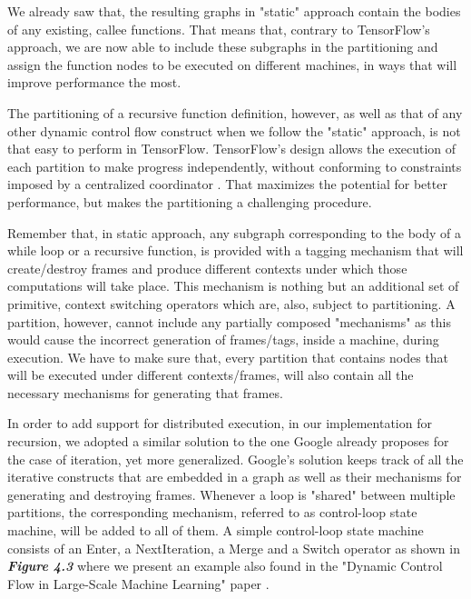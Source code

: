 \documentclass[ack,preface]{dithesis}
\begin{document}
We already saw that, the resulting graphs in "static" approach contain the bodies of any existing, callee functions. That means that, contrary to TensorFlow's approach, we are now able to include these subgraphs in the partitioning and assign the function nodes to be executed on different machines, in ways that will improve performance the most.

The partitioning of a recursive function definition, however, as well as that of any other dynamic control flow construct  when we follow the "static" approach, is not that easy to perform in TensorFlow.
TensorFlow's design allows the execution of each partition to make progress independently, without conforming to constraints imposed by a centralized coordinator \cite{Yu:2018}. That maximizes the potential for better performance, but makes the partitioning a challenging procedure.

Remember that, in static approach, any subgraph corresponding to the body of a while loop or a recursive function, is provided with a tagging mechanism that will create/destroy frames and produce different contexts under which those computations will take place. This mechanism is nothing but an additional set of primitive, context switching operators which are, also, subject to partitioning. A partition, however, cannot include any partially composed "mechanisms" as this would cause the incorrect generation of frames/tags, inside a machine, during execution. We have to make sure that, every partition that contains nodes that will be executed under different contexts/frames, will also contain all the necessary mechanisms for generating that frames.

In order to add support for distributed execution, in our implementation for recursion, we adopted a similar solution to the one Google already proposes for the case of iteration, yet more generalized. Google's solution keeps track of all the iterative constructs that are embedded in a graph as well as their mechanisms for generating and destroying frames. Whenever a loop is "shared" between multiple partitions, the corresponding mechanism, referred to as control-loop state machine,  will be added to all of them. A simple control-loop state machine consists of an Enter, a NextIteration, a Merge and a Switch operator as shown in  \textit{\textbf{Figure 4.3}} where we present an example also found in the "Dynamic Control Flow in Large-Scale Machine Learning" paper \cite{Yu:2018}.
\end{document}
